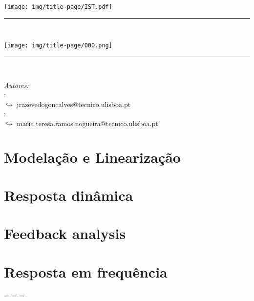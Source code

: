 \documentclass[a4paper,12pt]{article}
\makeatletter
\let\zzzfootnotesize\footnotesize
\def\newfootnotesize{%
\zzzfootnotesize
\abovedisplayskip=0pt
\belowdisplayskip=\abovedisplayskip
\abovedisplayshortskip=\abovedisplayskip
\belowdisplayshortskip=\abovedisplayskip
}
\renewcommand\footnotesize{\protect\newfootnotesize}
\def\maketitle{
  \begin{center}\leavevmode
        \normalfont
        \texttt{[image: img/title-page/IST.pdf]}
        \vskip 0.05cm   
        \textsc{\large \department}\\
        \vskip 0.5cm
        \rule{0.95\linewidth}{0.2 mm} %
        {\large \exam}\\[0.5 cm]
        {\huge \bfseries \@title \par} 
        \vspace{1em}
        \texttt{[image: img/title-page/000.png]}
        \rule{0.95\linewidth}{0.2 mm} \\[0.75 cm]
        \begin{minipage}[t]{1\textwidth}
	   \begin{flushleft} \large
                \emph{Autores:}\\
			\normalsize \textbf{\@author} : \studentID\\
                \fontsize{9pt}{11pt}\selectfont $\hookrightarrow$ jrazevedogoncalves@tecnico.ulisboa.pt \\
                \normalsize \textbf{\authorr} : \studentIDD\\
                \scriptsize $\hookrightarrow$ maria.teresa.ramos.nogueira@tecnico.ulisboa.pt
		\end{flushleft}
	\end{minipage}

    \vfill
	{\Large \@date\par}
   \end{center}
   \cleardoublepage
  }
\makeatother
\begin{document}
    \sloppy
    \maketitle
    \tableofcontents
    \setcounter{tocdepth}{4}
    \newpage
    \pagestyle{fancy}

    \clearpage
    \section{Modelação e Linearização}\label{sec:Modelacao_e_Linearizacao}%
        
        
        
    \clearpage
    \section{Resposta dinâmica}\label{sec:resposta-dinâmica}%
    
    

    \clearpage
    \section{Feedback analysis}
    
    
    

    \clearpage
    \section{Resposta em frequência}
    


    \clearpage
    
    \nocite{*}
    {\footnotesize%
    }
\end{document}
